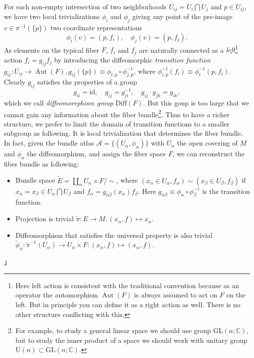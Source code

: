 \documentclass[10pt,nofootinbib,letterpaper]{revtex4}
\newenvironment{Note}{{\par~{\normalfont\bfseries Note.~「}}}{\hfill 」\par} %
\begin{document}
		For each non-empty intersection of two neighborhoods $U_{ij}=U_i\bigcap U_j$ and $p\in U_{ij}$, we have two local trivializations $\phi_i$ and $\phi_j$ giving any point of the pre-image $v\in\pi^{-1}(\{p\})$ two coordinate representations
		\begin{equation*}
			\phi_i(v)=(p,f_i),\quad \phi_j(v)=(p,f_j).
		\end{equation*}
		As elements on the typical fiber $F$, $f_i$ and $f_j$ are naturally connected as a {\color{red}\emph{left}\footnote{Here left action is consistent with the traditional convention because as an operator the automorphism $\mathop{\mathrm{Aut}}(F)$ is always assumed to act on $F$ on the left. But in principle you can define it as a right action as well. There is no other structure conflicting with this.} action $f_i=g_{ij} f_j$} by introducing the diffeomorphic \emph{transition function} $g_{ij}:U_{ij}\rightarrow\mathop{\mathrm{Aut}}(F), g_{ij}(\{p\})\equiv\phi_{i,p}\circ\phi_{j,p}^{-1}$, where $\phi_{i,p}^{-1}(f_{i})\equiv\phi_{i}^{-1}(p,f_{i})$. Clearly $g_{ij}$ satisfies the properties of a group
		\begin{equation*}
			g_{ii}=\mathrm{id},\quad g_{ij}=g_{ji}^{-1},\quad g_{ij}\cdot g_{jk}=g_{ik},
		\end{equation*}
		which we call \emph{diffeomorephism group} $\mathrm{Diff}(F)$. But this goup is too large that we cannot gain any information about the fiber bundle\footnote{For example, to study a general linear space we should use group $\mathrm{GL}(n;\mathbb{C})$, but to study the inner product of a space we should work with unitary group $\mathrm{U}(n)\subset\mathrm{GL}(n;\mathbb{C})$.}. Thus to have a richer structure, we prefer to limit the domain of transition functions to a smaller subgroup as following.
		\begin{Note}
			It is local trivialization that determines the fiber bundle. In fact, given the bundle atlas $\mathcal{A}=\{(U_\alpha,\phi_\alpha)\}$ with $U_\alpha$ the open covering of $M$ and $\phi_\alpha$ the diffeomorphism, and assign the fiber space $F$, we can reconstruct the fiber bundle as following:
			\begin{itemize}
				\item Bundle space $\widetilde{E}=\displaystyle\coprod_\alpha U_\alpha\times F/\sim$, where $(x_\alpha\in U_\alpha,f_\alpha)\sim(x_\beta\in U_\beta,f_\beta)$ if $x_\alpha=x_\beta\in U_\alpha\bigcap U_\beta$ and $f_\alpha=g_{\alpha\beta}(x_\alpha)f_\beta$. Here $g_{\alpha\beta}\equiv\phi_\alpha\circ\phi_\beta^{-1}$ is the transition function.
				\item Projection is trivial $\widetilde{\pi}:E\rightarrow M, (x_\alpha,f)\mapsto x_\alpha$.
				\item Diffeomorphism that satisfies the universal property is also trivial $\widetilde{\phi}_\alpha:\widetilde{\pi}^{-1}(U_\alpha)\rightarrow U_\alpha\times F: (x_\alpha,f)\mapsto (x_\alpha,f)$.
			\end{itemize}
		\end{Note}
\end{document}

